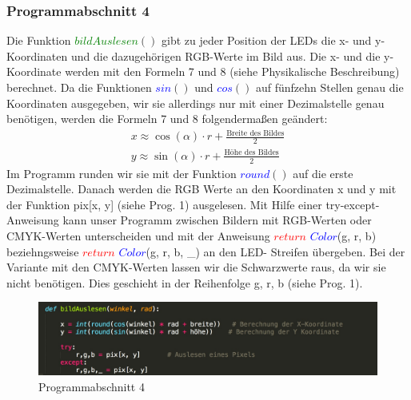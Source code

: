 \documentclass [a4paper, 11pt] {article}
\begin{document}
\subsubsection{Programmabschnitt 4}
Die Funktion \textcolor{green}{$bildAuslesen$}{$()$} gibt zu jeder Position der LEDs die x- und y-Koordinaten und die dazugehörigen RGB-Werte im Bild aus. Die x- und die y-Koordinate werden mit den Formeln 7 und 8 (siehe Physikalische Beschreibung) berechnet. Da die Funktionen \textcolor{blue}{$sin$}{$()$} und \textcolor{blue}{$cos$}{$()$} auf fünfzehn Stellen genau die Koordinaten ausgegeben, wir sie allerdings nur mit einer Dezimalstelle genau benötigen, werden die Formeln 7 und 8 folgendermaßen geändert:
\begin{align}
x \approx \cos (\alpha) \cdot r + \frac{\text{Breite \ des \ Bildes}}{2} \\
y \approx\sin (\alpha) \cdot r + \frac{\text{Höhe\ des\ Bildes}}{2}
\end{align}
Im Programm runden wir sie mit der Funktion \textcolor{blue}{$round$}{$()$} auf die erste Dezimalstelle. Danach werden die RGB Werte an den Koordinaten x und y mit der Funktion pix[x, y] (siehe Prog. 1) ausgelesen. Mit Hilfe einer try-except-Anweisung kann unser Programm zwischen Bildern mit RGB-Werten oder CMYK-Werten unterscheiden und mit der Anweisung \textcolor{red}{$return$} \textcolor{blue}{$Color$}(g, r, b) beziehngsweise \textcolor{red}{$return$} \textcolor{blue}{$Color$}(g, r, b, \_) an den LED- Streifen übergeben. Bei der Variante mit den CMYK-Werten lassen wir die Schwarzwerte raus, da wir sie nicht benötigen. Dies geschieht in der Reihenfolge g, r, b (siehe Prog. 1).
\begin{figure}[h]
	\centering
	\includegraphics[width=16cm]{P4.png}
	\caption{Programmabschnitt 4}
\end{figure}
\end{document}
